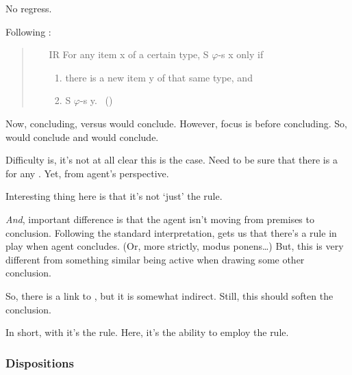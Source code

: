 \begin{note}
  No regress.

  Following \citeauthor{Wieland:2013vf}:

  \begin{quote}
    \begin{itemize}[noitemsep]
    \item[IR]
      For any item x of a certain type, S \(\varphi\)-s x only if
      \begin{enumerate}[label=(\roman*),noitemsep]
      \item
        there is a new item y of that same type, and
      \item
        S \(\varphi\)-s y.%
        \mbox{ }\hfill\mbox{(\citeyear[996]{Wieland:2013vf})}
      \end{enumerate}
    \end{itemize}
  \end{quote}

  Now, concluding, versus would conclude.
  However, focus is before concluding.
  So, would conclude and would conclude.

  Difficulty is, it's not at all clear this is the case.
  Need to be sure that there is a \requ{} for any \requ{}.
  Yet, from agent's perspective.
\end{note}

\begin{note}
  Interesting thing here is that it's not `just' the rule.

  \emph{And}, important difference is that the agent isn't moving from premises to conclusion.
  Following the standard interpretation, \citeauthor{Carroll:1895uj} gets us that there's a rule in play when agent concludes.
  (Or, more strictly, modus ponens\dots)
  But, this is very different from something similar being active when drawing some other conclusion.

  So, there is a link to \citeauthor{Carroll:1895uj}, but it is somewhat indirect.
  Still, this should soften the conclusion.

  In short, with \citeauthor{Carroll:1895uj} it's the rule.
  Here, it's the ability to employ the rule.
\end{note}


\subsubsection{Dispositions}
\label{sec:dispositions}

